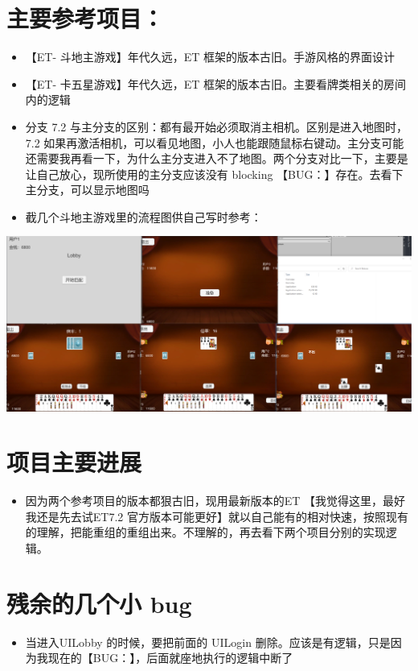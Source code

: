 \documentclass[9pt, b5paper]{article}
\begin{document}
\section{主要参考项目：}
\label{sec:org9aee684}
\begin{itemize}
\item 【ET- 斗地主游戏】年代久远，ET 框架的版本古旧。手游风格的界面设计
\item 【ET- 卡五星游戏】年代久远，ET 框架的版本古旧。主要看牌类相关的房间内的逻辑
\item 分支 7.2 与主分支的区别：都有最开始必须取消主相机。区别是进入地图时，7.2 如果再激活相机，可以看见地图，小人也能跟随鼠标右键动。主分支可能还需要我再看一下，为什么主分支进入不了地图。两个分支对比一下，主要是让自己放心，现所使用的主分支应该没有 blocking 【BUG：】存在。去看下主分支，可以显示地图吗
\item 截几个斗地主游戏里的流程图供自己写时参考：
\end{itemize}

\begin{center}
\includegraphics[width=.9\linewidth]{./pic/readme_20230511_163501.png}
\end{center}
\section{项目主要进展}
\label{sec:org04a5e04}
\begin{itemize}
\item 因为两个参考项目的版本都狠古旧，现用最新版本的ET 【我觉得这里，最好我还是先去试ET7.2 官方版本可能更好】就以自己能有的相对快速，按照现有的理解，把能重组的重组出来。不理解的，再去看下两个项目分别的实现逻辑。
\end{itemize}
\section{残余的几个小 bug}
\label{sec:orgd31139c}
\begin{itemize}
\item 当进入UILobby 的时候，要把前面的 UILogin 删除。应该是有逻辑，只是因为我现在的【BUG：】，后面就座地执行的逻辑中断了
\end{itemize}
\end{document}
